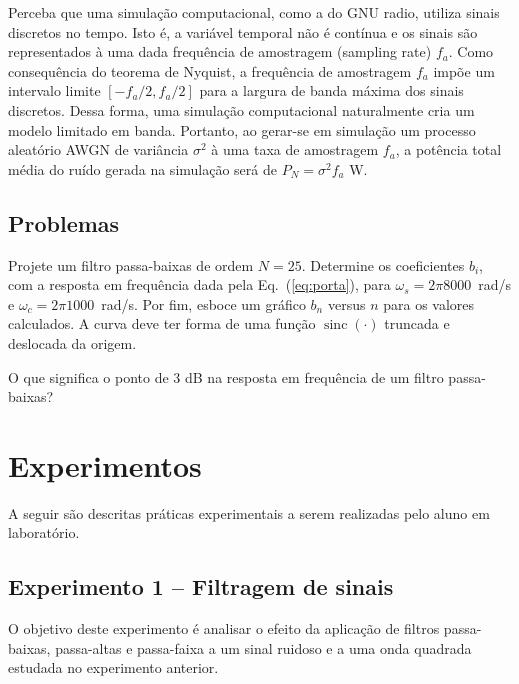 \documentclass[12pt,addpoints]{exam}
\begin{document}
Perceba que uma simulação computacional, como a do GNU radio, utiliza sinais discretos no tempo. Isto é, a variável temporal não é contínua e os sinais são representados à uma dada frequência de amostragem (sampling rate) $f_a$. Como consequência do teorema de Nyquist, a frequência de amostragem $f_a$ impõe um intervalo limite $[-f_a/2,f_a/2]$ para a largura de banda máxima dos sinais discretos. Dessa forma, uma simulação computacional naturalmente cria um modelo limitado em banda. Portanto, ao gerar-se em simulação um processo aleatório AWGN de variância $\sigma^2$ à uma taxa de amostragem $f_a$, a potência total média do ruído gerada na simulação será de $P_N = \sigma^2f_a$ W.

\subsection{Problemas}

\begin{questions}

\question Projete um filtro passa-baixas de ordem $N = 25$. Determine os coeficientes $b_i$, com a resposta em frequência dada pela Eq.~(\ref{eq:porta}), para $\omega_s = 2\pi 8000$~rad/s e $\omega_c = 2\pi 1000$~rad/s. Por fim, esboce um gráfico $b_n$ versus $n$ para os valores calculados. A curva deve ter forma de uma função $\operatorname{sinc}{(\cdot)}$ truncada e deslocada da origem.

\question O que significa o ponto de 3 dB na resposta em frequência de um filtro passa-baixas?

\end{questions}

\section{Experimentos}

A seguir são descritas práticas experimentais a serem realizadas pelo aluno em laboratório. 

\subsection{Experimento 1 -- Filtragem de sinais}

O objetivo deste experimento é analisar o efeito da aplicação de filtros passa-baixas, passa-altas e passa-faixa a um sinal ruidoso e a uma onda quadrada estudada no experimento anterior.
\end{document}
